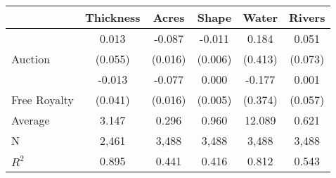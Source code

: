 
\begin{tabular}{lccccc}
\toprule
 & Thickness & Acres & Shape & Water & Rivers\\
\midrule
 & 0.013 & -0.087 & -0.011 & 0.184 & 0.051\\

\multirow{-2}{*}{\raggedright\arraybackslash Auction} & (0.055) & (0.016) & (0.006) & (0.413) & (0.073)\\

 & -0.013 & -0.077 & 0.000 & -0.177 & 0.001\\

\multirow{-2}{*}{\raggedright\arraybackslash Free Royalty} & (0.041) & (0.016) & (0.005) & (0.374) & (0.057)\\

\midrule
Average & 3.147 & 0.296 & 0.960 & 12.089 & 0.621\\

N & 2,461 & 3,488 & 3,488 & 3,488 & 3,488\\

$R^2$ & 0.895 & 0.441 & 0.416 & 0.812 & 0.543\\
\bottomrule
\end{tabular}
